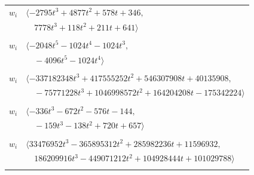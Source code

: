 \documentclass[11pt]{article}
\begin{document}
\begin{longtable}{@{}ll@{}}
$w_i$ & $\langle -2795t^{3}+4877t^{2}+578t+346,$\\
 & $\quad 7778t^{3}+118t^{2}+211t+641\rangle$\\
\addlinespace[2pt]
\multicolumn{2}{@{}p{0.97\textwidth}@{}}{$i=45$, $D_i=1024$, $\rho_{ij}$: $6{:}2, \allowbreak 10{:}1, \allowbreak 13{:}1, \allowbreak 15{:}1, \allowbreak 21{:}2, \allowbreak 29{:}2, \allowbreak 36{:}2$}\\
$w_i$ & $\langle -2048t^{5}-1024t^{4}-1024t^{3},$\\
 & $\quad -4096t^{5}-1024t^{4}\rangle$\\
\addlinespace[2pt]
\multicolumn{2}{@{}p{0.97\textwidth}@{}}{$i=46$, $D_i=1048576$, $\rho_{ij}$: $7{:}1, \allowbreak 10{:}2, \allowbreak 12{:}1, \allowbreak 15{:}2, \allowbreak 18{:}2, \allowbreak 23{:}1, \allowbreak 27{:}1, \allowbreak 28{:}1, \allowbreak 30{:}1, \allowbreak 32{:}1, \allowbreak 33{:}1, \allowbreak 38{:}2, \allowbreak 39{:}1, \allowbreak 43{:}2, \allowbreak 53{:}1, \allowbreak 60{:}1, \allowbreak 64{:}1, \allowbreak 65{:}1, \allowbreak 68{:}2, \allowbreak 71{:}1$}\\
$w_i$ & $\langle -337182348t^{3}+417555252t^{2}+546307908t+40135908,$\\
 & $\quad -75771228t^{3}+1046998572t^{2}+164204208t-175342224\rangle$\\
\addlinespace[2pt]
\multicolumn{2}{@{}p{0.97\textwidth}@{}}{$i=47$, $D_i=32$, $\rho_{ij}$: $2{:}2, \allowbreak 15{:}1, \allowbreak 19{:}1, \allowbreak 21{:}2, \allowbreak 31{:}1, \allowbreak 57{:}1, \allowbreak 58{:}1, \allowbreak 64{:}2, \allowbreak 75{:}1, \allowbreak 77{:}1$}\\
$w_i$ & $\langle -336t^{3}-672t^{2}-576t-144,$\\
 & $\quad -159t^{3}-138t^{2}+720t+657\rangle$\\
\addlinespace[2pt]
\multicolumn{2}{@{}p{0.97\textwidth}@{}}{$i=48$, $D_i=524288$, $\rho_{ij}$: $6{:}1, \allowbreak 7{:}1, \allowbreak 11{:}2, \allowbreak 13{:}1, \allowbreak 17{:}1, \allowbreak 25{:}2, \allowbreak 29{:}1, \allowbreak 32{:}2, \allowbreak 36{:}2, \allowbreak 38{:}1, \allowbreak 53{:}1, \allowbreak 56{:}1, \allowbreak 64{:}2, \allowbreak 68{:}2, \allowbreak 70{:}1, \allowbreak 73{:}2, \allowbreak 76{:}2, \allowbreak 77{:}2$}\\
$w_i$ & $\langle 33476952t^{3}-365895312t^{2}+285982236t+11596932,$\\
 & $\quad 186209916t^{3}-449071212t^{2}+104928444t+101029788\rangle$\\
\addlinespace[2pt]
\multicolumn{2}{@{}p{0.97\textwidth}@{}}{$i=49$, $D_i=2048$, $\rho_{ij}$: $0{:}2, \allowbreak 7{:}1, \allowbreak 9{:}1, \allowbreak 11{:}1, \allowbreak 13{:}1, \allowbreak 18{:}1, \allowbreak 34{:}2, \allowbreak 36{:}2, \allowbreak 59{:}2, \allowbreak 62{:}2, \allowbreak 63{:}1, \allowbreak 72{:}1, \allowbreak 75{:}2$}\\

\end{longtable}
\end{document}
